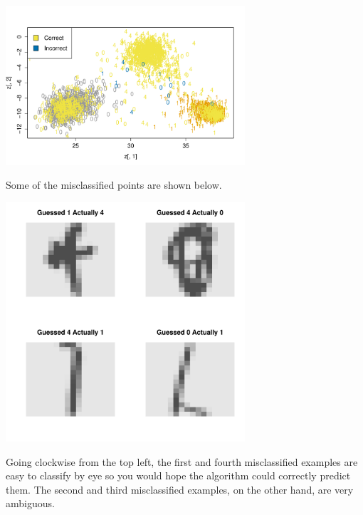 \documentclass[12pt]{article}
\newcommand{\1}{\mathbbm{1}}
\begin{document}
\begin{enumerate}[(a)]
\begin{center}
\includegraphics[width=3.5in]{prob5_d_1.pdf}
\end{center}
Some of the misclassified points are shown below.
\begin{center}
\includegraphics[width=3.5in]{prob5_d_2.pdf}
\end{center}
Going clockwise from the top left, the first and fourth misclassified examples are easy to classify by eye so you would hope the algorithm could correctly predict them. The second and third misclassified examples, on the other hand, are very ambiguous.
\end{enumerate}

\newpage
\end{document}
